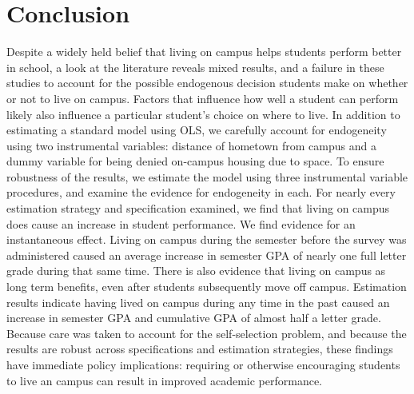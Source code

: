 \documentclass[12pt]{article}
\begin{document}
\section{Conclusion}
Despite a widely held belief that living on campus helps students perform better in school, a look at the literature reveals mixed results, and a failure in these studies to account for the possible endogenous decision students make on whether or not to live on campus.  Factors that influence how well a student can perform likely also influence a particular student's choice on where to live.  In addition to estimating a standard model using OLS, we carefully account for endogeneity using two instrumental variables: distance of hometown from campus and a dummy variable for being denied on-campus housing due to space.  To ensure robustness of the results, we estimate the model using three instrumental variable procedures, and examine the evidence for endogeneity in each.  For nearly every estimation strategy and specification examined, we find that living on campus does cause an increase in student performance.  We find evidence for an instantaneous effect.  Living on campus during the semester before the survey was administered caused an average increase in semester GPA of nearly one full letter grade during that same time.  There is also evidence that living on campus as long term benefits, even after students subsequently move off campus.  Estimation results indicate having lived on campus during any time in the past caused an increase in semester GPA and cumulative GPA of almost half a letter grade.  Because care was taken to account for the self-selection problem, and because the results are robust across specifications and estimation strategies, these findings have immediate policy implications: requiring or otherwise encouraging students to live an campus can result in improved academic performance.

\newpage
\begin{singlespace}
\nocite{*}


\end{singlespace}

\newpage
\end{document}

